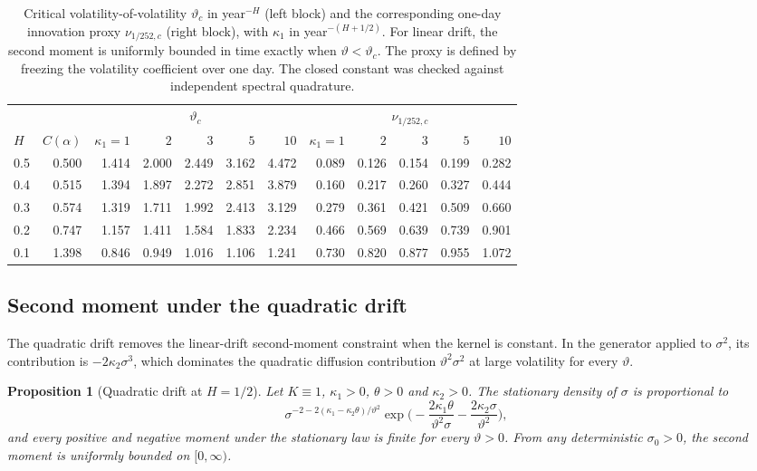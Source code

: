 \documentclass[11pt,a4paper]{article}
\newtheorem{proposition}[theorem]{Proposition}
\theoremstyle{definition}
\begin{document}
\begin{table}[ht]
\centering
\small
\caption{Critical volatility-of-volatility $\vartheta_c$ in year$^{-H}$ (left block) and the corresponding one-day innovation proxy $\nu_{1/252,c}$ (right block), with $\kappa_1$ in year$^{-(H+1/2)}$. For linear drift, the second moment is uniformly bounded in time exactly when $\vartheta<\vartheta_c$. The proxy is defined by freezing the volatility coefficient over one day. The closed constant was checked against independent spectral quadrature.}\label{tab:critical}
\begin{tabular}{lrrrrrrrrrrr}
\toprule
 & & \multicolumn{5}{c}{$\vartheta_c$} & \multicolumn{5}{c}{$\nu_{1/252,c}$} \\
\cmidrule(lr){3-7}\cmidrule(lr){8-12}
$H$ & $C(\alpha)$ & $\kappa_1=1$ & $2$ & $3$ & $5$ & $10$ & $\kappa_1=1$ & $2$ & $3$ & $5$ & $10$ \\
\midrule
0.5 & 0.500 & 1.414 & 2.000 & 2.449 & 3.162 & 4.472 & 0.089 & 0.126 & 0.154 & 0.199 & 0.282 \\
0.4 & 0.515 & 1.394 & 1.897 & 2.272 & 2.851 & 3.879 & 0.160 & 0.217 & 0.260 & 0.327 & 0.444 \\
0.3 & 0.574 & 1.319 & 1.711 & 1.992 & 2.413 & 3.129 & 0.279 & 0.361 & 0.421 & 0.509 & 0.660 \\
0.2 & 0.747 & 1.157 & 1.411 & 1.584 & 1.833 & 2.234 & 0.466 & 0.569 & 0.639 & 0.739 & 0.901 \\
0.1 & 1.398 & 0.846 & 0.949 & 1.016 & 1.106 & 1.241 & 0.730 & 0.820 & 0.877 & 0.955 & 1.072 \\
\bottomrule
\end{tabular}
\end{table}

\subsection{Second moment under the quadratic drift}\label{sec:classical_qd}

The quadratic drift removes the linear-drift second-moment constraint when the kernel is constant. In the generator applied to $\sigma^2$, its contribution is $-2\kappa_2\sigma^3$, which dominates the quadratic diffusion contribution $\vartheta^2\sigma^2$ at large volatility for every $\vartheta$.

\begin{proposition}[Quadratic drift at $H=1/2$]\label{prop:classical_qd}
Let $K\equiv1$, $\kappa_1>0$, $\theta>0$ and $\kappa_2>0$. The stationary density of $\sigma$ is proportional to
\begin{equation}\label{eq:stationary_density}
\sigma^{-2-2(\kappa_1-\kappa_2\theta)/\vartheta^2}\exp\Big(-\frac{2\kappa_1\theta}{\vartheta^2\sigma}-\frac{2\kappa_2\sigma}{\vartheta^2}\Big),
\end{equation}
and every positive and negative moment under the stationary law is finite for every $\vartheta>0$. From any deterministic $\sigma_0>0$, the second moment is uniformly bounded on $[0,\infty)$.
\end{proposition}
\end{document}
